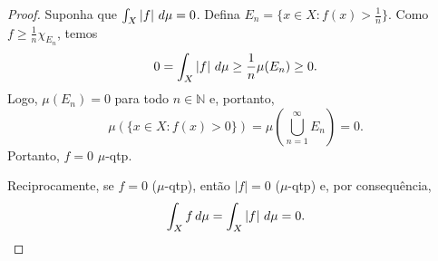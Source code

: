 \begin{proof}
    Suponha que $\int_X \left| f \right| \, d\mu = 0$. Defina $E_n = \{x \in X : f(x) > \frac{1}{n} \}$. Como $f \geq \frac{1}{n} \chi_{E_n}$, temos
    \[
    0 = \int_X \left| f \right| \, d\mu \geq \frac{1}{n} \mu(E_n) \geq 0.
    \]
    Logo, $\mu(E_n) = 0$ para todo $n \in \mathbb{N}$ e, portanto, 
    \[
    \mu(\{ x \in X : f(x) > 0 \}) = \mu\left( \bigcup_{n=1}^{\infty} E_n \right) = 0.
    \]
    Portanto, $f = 0$ $\mu$-qtp.

    Reciprocamente, se $f = 0$ ($\mu$-qtp), então $|f| = 0$ ($\mu$-qtp) e, por consequência, 
    \[
    \int_X f \, d\mu = \int_X \left| f \right| \, d\mu = 0.
    \]
\end{proof}
